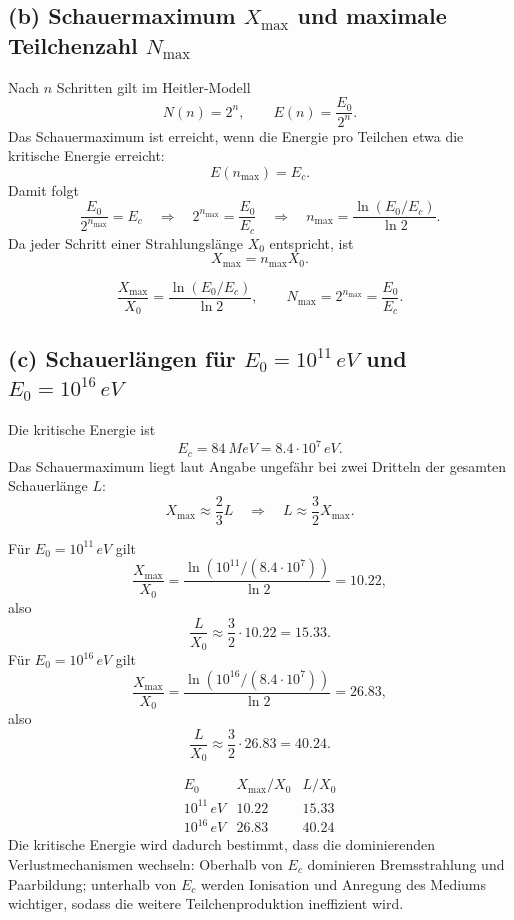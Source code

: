 \documentclass[11pt,a4paper]{scrartcl}
\newcommand{\paren}[1]{\left( #1 \right)}
\theoremstyle{definition}
\theoremstyle{plain}
\theoremstyle{remark}
\begin{document}
\subsection*{(b) Schauermaximum $X_{\max}$ und maximale Teilchenzahl $N_{\max}$}

\begin{calculationbox}
Nach $n$ Schritten gilt im Heitler-Modell
\[
    N(n)=2^n,
    \qquad
    E(n)=\frac{E_0}{2^n}.
\]
Das Schauermaximum ist erreicht, wenn die Energie pro Teilchen etwa die kritische Energie erreicht:
\[
    E(n_{\max})=E_c.
\]
Damit folgt
\[
    \frac{E_0}{2^{n_{\max}}}=E_c
    \quad\Longrightarrow\quad
    2^{n_{\max}}=\frac{E_0}{E_c}
    \quad\Longrightarrow\quad
    n_{\max}=\frac{\ln(E_0/E_c)}{\ln 2}.
\]
Da jeder Schritt einer Strahlungsl\"ange $X_0$ entspricht, ist
\[
    X_{\max}=n_{\max}X_0.
\]
\end{calculationbox}

\begin{answerbox}
\[
    \boxed{\frac{X_{\max}}{X_0}=\frac{\ln(E_0/E_c)}{\ln 2}},
    \qquad
    \boxed{N_{\max}=2^{n_{\max}}=\frac{E_0}{E_c}}.
\]
\end{answerbox}

\subsection*{(c) Schauerl\"angen f\"ur $E_0=10^{11}\,\si{eV}$ und $E_0=10^{16}\,\si{eV}$}

\begin{calculationbox}
Die kritische Energie ist
\[
    E_c=\SI{84}{MeV}=8.4\cdot 10^7\,\si{eV}.
\]
Das Schauermaximum liegt laut Angabe ungef\"ahr bei zwei Dritteln der gesamten Schauerl\"ange $L$:
\[
    X_{\max}\approx \frac{2}{3}L
    \quad\Longrightarrow\quad
    L\approx \frac{3}{2}X_{\max}.
\]
\end{calculationbox}

\begin{calculationbox}[title=Numerik]
F\"ur $E_0=10^{11}\,\si{eV}$ gilt
\[
    \frac{X_{\max}}{X_0}
    =\frac{\ln\paren{10^{11}/(8.4\cdot 10^7)}}{\ln 2}
    =10.22,
\]
also
\[
    \frac{L}{X_0}\approx \frac{3}{2}\cdot 10.22=15.33.
\]
F\"ur $E_0=10^{16}\,\si{eV}$ gilt
\[
    \frac{X_{\max}}{X_0}
    =\frac{\ln\paren{10^{16}/(8.4\cdot 10^7)}}{\ln 2}
    =26.83,
\]
also
\[
    \frac{L}{X_0}\approx \frac{3}{2}\cdot 26.83=40.24.
\]
\end{calculationbox}

\begin{answerbox}
\[
\begin{array}{c|c|c}
E_0 & X_{\max}/X_0 & L/X_0 \\
\hline
10^{11}\,\si{eV} & 10.22 & 15.33 \\
10^{16}\,\si{eV} & 26.83 & 40.24
\end{array}
\]
Die kritische Energie wird dadurch bestimmt, dass die dominierenden Verlustmechanismen wechseln: Oberhalb von $E_c$ dominieren Bremsstrahlung und Paarbildung; unterhalb von $E_c$ werden Ionisation und Anregung des Mediums wichtiger, sodass die weitere Teilchenproduktion ineffizient wird.
\end{answerbox}
\end{document}
